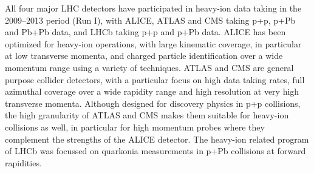 All four major LHC detectors have participated in heavy-ion data taking
in the 2009--2013 period (Run I), with ALICE, ATLAS and CMS taking p+p, p+Pb and
Pb+Pb data, and LHCb taking p+p and p+Pb data. ALICE\cite{ALICE} has been optimized
for heavy-ion operations, with large kinematic coverage, in particular at low 
transverse momenta, and charged particle identification over a wide 
momentum range using a variety of techniques. ATLAS\cite{ATLAS} and CMS\cite{CMS} are general purpose
collider detectors, with a particular focus on high data taking rates, full 
azimuthal coverage over a wide rapidity range and high resolution at very 
high transverse momenta. Although designed for discovery physics in p+p 
collisions, the high granularity of ATLAS and CMS makes them suitable
for heavy-ion collisions as well, in particular for high momentum 
probes where they complement the strengths of the ALICE detector. The heavy-ion 
related program of LHCb\cite{LHCb} was focussed on quarkonia measurements in p+Pb 
collisions at forward rapidities.